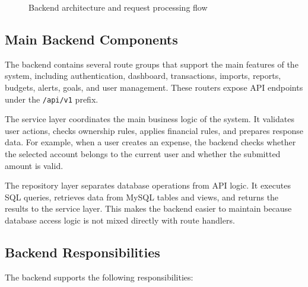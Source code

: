 ﻿\documentclass{article}
\begin{document}
\begin{figure}[H]
{
}
\caption{Backend architecture and request processing flow}
\label{fig:backend-architecture-flow}
\end{figure}

\subsection{Main Backend Components}

The backend contains several route groups that support the main features of the system, including authentication, dashboard, transactions, imports, reports, budgets, alerts, goals, and user management. These routers expose API endpoints under the \texttt{/api/v1} prefix.

The service layer coordinates the main business logic of the system. It validates user actions, checks ownership rules, applies financial rules, and prepares response data. For example, when a user creates an expense, the backend checks whether the selected account belongs to the current user and whether the submitted amount is valid.

The repository layer separates database operations from API logic. It executes SQL queries, retrieves data from MySQL tables and views, and returns the results to the service layer. This makes the backend easier to maintain because database access logic is not mixed directly with route handlers.

\subsection{Backend Responsibilities}

The backend supports the following responsibilities:
\end{document}
